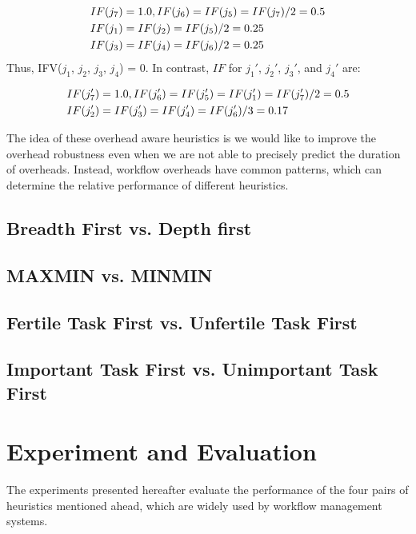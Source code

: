 \documentclass[final]{IEEEtran}
\begin{document}
\begin{eqnarray}
	\displaystyle  
	&IF(j_7 )=1.0, IF(j_6 )=IF(j_5 )=IF(j_7 )/2=0.5\nonumber  \\
	&IF(j_1 )=IF(j_2 )=IF(j_5 )/2=0.25\nonumber \\
	&IF(j_3 )=IF(j_4 )=IF(j_6 )/2=0.25\nonumber 
\end{eqnarray}
Thus, IFV($j_1$, $j_2$, $j_3$, $j_4$) = 0. In contrast, $IF$ for $j_1'$, $j_2'$, $j_3'$, and $j_4'$ are:

\begin{eqnarray}
	\displaystyle  
	&IF(j_7')=1.0, IF(j_6')=IF(j_5')=IF(j_1')=IF(j_7')/2=0.5\nonumber \\
	&IF(j_2')=IF(j_3')=IF(j_4')=IF(j_6')/3=0.17 \nonumber
\end{eqnarray}



The idea of these overhead aware heuristics is we would like to improve the overhead robustness even when we are not able to precisely predict the duration of overheads. Instead, workflow overheads have common patterns, which can determine the relative performance of different heuristics. 

\subsection{Breadth First vs. Depth first}

\subsection{MAXMIN vs. MINMIN}

\subsection{Fertile Task First vs. Unfertile Task First}

\subsection{Important Task First vs. Unimportant Task First}

\section{Experiment and Evaluation}
\label{sec:experiments}

The experiments presented hereafter evaluate the performance of the four pairs of heuristics mentioned ahead, which are widely used by workflow management systems. 
\end{document}
